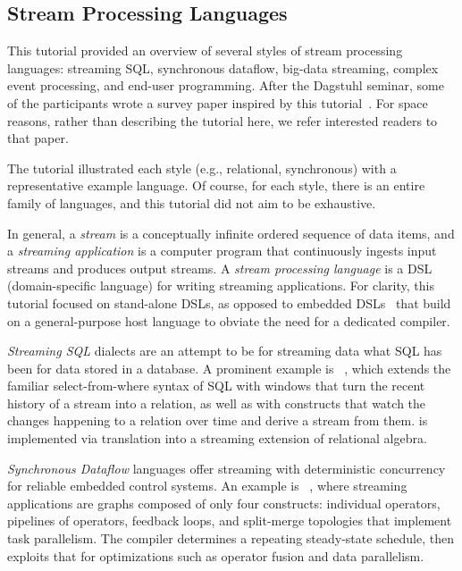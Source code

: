 \subsection{Stream Processing Languages}\label{sec:tut_lang}

This tutorial provided an overview of several styles of stream
processing languages: streaming SQL, synchronous dataflow, big-data
streaming, complex event processing, and end-user programming. After
the Dagstuhl seminar, some of the participants wrote a
survey paper inspired by this tutorial~\cite{hirzel_et_al_2018}. For
space reasons, rather than describing the tutorial here, we refer
interested readers to that paper.

\iffalse
The tutorial illustrated each style (e.g., relational,
synchronous) with a representative example language. Of course,
for each style, there is an entire family of languages, and this
tutorial did not aim to be exhaustive.

In general, a \emph{stream} is a conceptually infinite ordered
sequence of data items, and a \emph{streaming application} is a
computer program that continuously ingests input streams and produces
output streams.  A \emph{stream processing language} is a DSL
(domain-specific language) for writing streaming applications.  For
clarity, this tutorial focused on stand-alone DSLs, as opposed to
embedded DSLs~\cite{hudak_1998} that build on a general-purpose host
language to obviate the need for a dedicated compiler.

\emph{Streaming SQL} dialects are an attempt to be for streaming data
what SQL has been for data stored in a database. A prominent example
is ~\cite{arasu_babu_widom_2006}, which extends the familiar
select-from-where syntax of SQL with windows that turn the recent
history of a stream into a relation, as well as with constructs that
watch the changes happening to a relation over time and derive a
stream from them.  is implemented via translation into a streaming
extension of relational algebra.

\emph{Synchronous Dataflow} languages offer streaming with
deterministic concurrency for reliable embedded control systems. An
example is ~\cite{thies_et_al_2002}, where streaming
applications are graphs composed of only four constructs: individual
operators, pipe\-lines of operators, feedback loops, and split-merge
topologies that implement task parallelism. The  compiler
determines a repeating steady-state schedule, then exploits that for
optimizations such as operator fusion and data parallelism.

